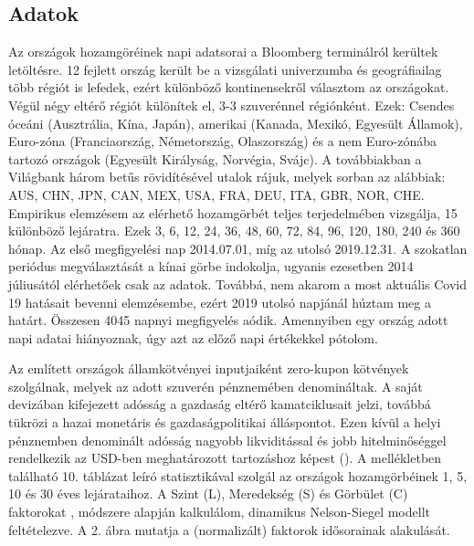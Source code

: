 \documentclass[12pt,bibliography=totoc]{article}
\begin{document}
\subsection{Adatok}
Az országok hozamgöréinek napi adatsorai a Bloomberg terminálról kerültek letöltésre. 12 fejlett ország került be a vizsgálati univerzumba és geográfiailag több régiót is lefedek, ezért különböző kontinensekről választom az országokat. Végül négy eltérő régiót különítek el, 3-3 szuverénnel régiónként. Ezek: Csendes óceáni (Ausztrália, Kína, Japán), amerikai (Kanada, Mexikó, Egyesült Államok), Euro-zóna (Franciaország, Németország, Olaszország) és a nem Euro-zónába tartozó országok (Egyesült Királyság, Norvégia, Svájc). A továbbiakban a Világbank három betűs rövidítésével utalok rájuk, melyek sorban az alábbiak: AUS, CHN, JPN, CAN, MEX, USA, FRA, DEU, ITA, GBR, NOR, CHE. Empirikus elemzésem az elérhető hozamgörbét teljes terjedelmében vizsgálja, 15 különböző lejáratra. Ezek 3, 6, 12, 24, 36, 48, 60, 72, 84, 96, 120, 180, 240 és 360 hónap. Az első megfigyelési nap 2014.07.01, míg az utolsó 2019.12.31. A szokatlan periódus megválasztását a kínai görbe indokolja, ugyanis ezesetben 2014 júliusától elérhetőek csak az adatok. Továbbá, nem akarom a most aktuális Covid 19 hatásait bevenni elemzésembe, ezért 2019 utolsó napjánál húztam meg a határt. Összesen 4045 napnyi megfigyelés aódik. Amennyiben egy ország adott napi adatai hiányoznak, úgy azt az előző napi értékekkel pótolom.

Az említett országok államkötvényei inputjaiként zero-kupon kötvények szolgálnak, melyek az adott szuverén pénznemében denomináltak. A saját devizában kifejezett adósság a gazdaság eltérő kamatciklusait jelzi, továbbá tükrözi a hazai monetáris és gazdaságpolitikai álláspontot. Ezen kívül a helyi pénznemben denominált adósság nagyobb likviditással és jobb hitelminőséggel rendelkezik az USD-ben meghatározott tartozáshoz képest (\cite{sowmya2016linkages}).
A mellékletben található 10. táblázat leíró statisztikával szolgál az országok hozamgörbéinek 1, 5, 10 és 30 éves lejárataihoz. A Szint (L), Meredekség (S) és Görbület (C) faktorokat \cite{diebold2006forecasting}, \cite{diebold2008global} módszere alapján kalkulálom, dinamikus Nelson-Siegel modellt feltételezve. A 2. ábra mutatja a (normalizált) faktorok idősorainak alakulását.

\end{document}
